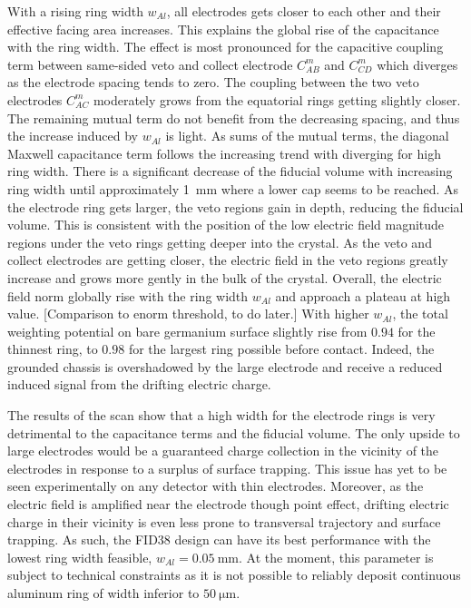 With a rising ring width $w_{Al}$, all electrodes gets closer to each other and their effective facing area increases. This explains the global rise of the capacitance with the ring width. The effect is most pronounced for the capacitive coupling term between same-sided veto and collect electrode $C_{AB}^m$ and $C_{CD}^m$ which diverges as the electrode spacing tends to zero. The coupling between the two veto electrodes $C_{AC}^m$ moderately grows from the equatorial rings getting slightly closer. The remaining mutual term do not benefit from the decreasing spacing, and thus the increase induced by $w_{Al}$ is light. As sums of the mutual terms, the diagonal Maxwell capacitance term follows the increasing trend with diverging for high ring width.
There is a significant decrease of the fiducial volume with increasing ring width until approximately \SI{1}{\mm} where a lower cap seems to be reached. As the electrode ring gets larger, the veto regions gain in depth, reducing the fiducial volume. 
This is consistent with the position of the low electric field magnitude regions under the veto rings getting deeper into the crystal. As the veto and collect electrodes are getting closer, the electric field in the veto regions greatly increase and grows more gently in the bulk of the crystal. Overall, the electric field norm globally rise with the ring width $w_{Al}$ and approach a plateau at high value. {\color{red} [Comparison to enorm threshold, to do later.]}
With higher $w_{Al}$, the total weighting potential on bare germanium surface slightly rise from $0.94$ for the thinnest ring, to $0.98$ for the largest ring possible before contact. Indeed, the grounded chassis is overshadowed by the large electrode and receive a reduced induced signal from the drifting electric charge.

The results of the scan show that a high width for the electrode rings is very detrimental to the capacitance terms and the fiducial volume. The only upside to large electrodes would be a guaranteed charge collection in the vicinity of the electrodes in response to a surplus of surface trapping. This issue has yet to be seen experimentally on any detector with thin electrodes. Moreover, as the electric field is amplified near the electrode though point effect, drifting electric charge in their vicinity is even less prone to transversal trajectory and surface trapping. As such, the FID38 design can have its best performance with the lowest ring width feasible, $w_{Al}=\SI{0.05}{\mm}$. At the moment, this parameter is subject to technical constraints as it is not possible to reliably deposit continuous aluminum ring of width inferior to $\SI{50}{\micro\meter}$. 



